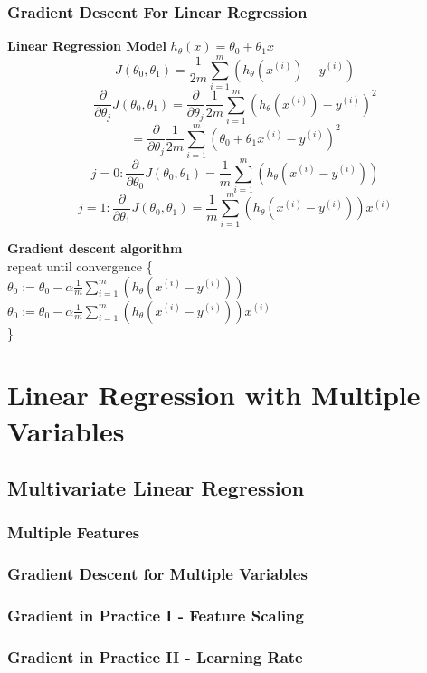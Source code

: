 \documentclass{article}
\begin{document}
\subsubsection{Gradient Descent For Linear Regression}
\textbf{Linear Regression Model}
$h_\theta(x) = \theta_0 + \theta_1 x$
$$J(\theta_0, \theta_1) = \frac{1}{2m} \sum_{i=1}^{m}(h_\theta(x^{(i)}) - y^{(i)})$$
$$\frac{\partial}{\partial \theta_j}J(\theta_0, \theta_1) = \frac{\partial}{\partial \theta_j} \frac{1}{2m} \sum_{i=1}^{m}(h_\theta(x^{(i)}) - y^{(i)})^2$$
$$ = \frac{\partial}{\partial \theta_j} \frac{1}{2m} \sum_{i=1}^{m}(\theta_0 + \theta_1 x^{(i)} - y^{(i)})^2$$
$$j = 0: \frac{\partial}{\partial \theta_0}J(\theta_0, \theta_1) = \frac{1}{m} \sum_{i=1}^{m}(h_\theta(x^{(i)} - y^{(i)}))$$
$$j = 1: \frac{\partial}{\partial \theta_1}J(\theta_0, \theta_1) = \frac{1}{m} \sum_{i=1}^{m}(h_\theta(x^{(i)} - y^{(i)})) x^{(i)}$$

\textbf{Gradient descent algorithm}\\
repeat until convergence \{\\
$\theta_0 := \theta_0 - \alpha \frac{1}{m} \sum_{i=1}^{m}(h_\theta(x^{(i)} - y^{(i)})) $ \\
$\theta_0 := \theta_0 - \alpha \frac{1}{m} \sum_{i=1}^{m}(h_\theta(x^{(i)} - y^{(i)})) x^{(i)} $ \\
\}\\

\section{Linear Regression with Multiple Variables}
\subsection{Multivariate Linear Regression}
\subsubsection{Multiple Features}
\subsubsection{Gradient Descent for Multiple Variables}
\subsubsection{Gradient in Practice I - Feature Scaling}
\subsubsection{Gradient in Practice II - Learning Rate}
\end{document}
